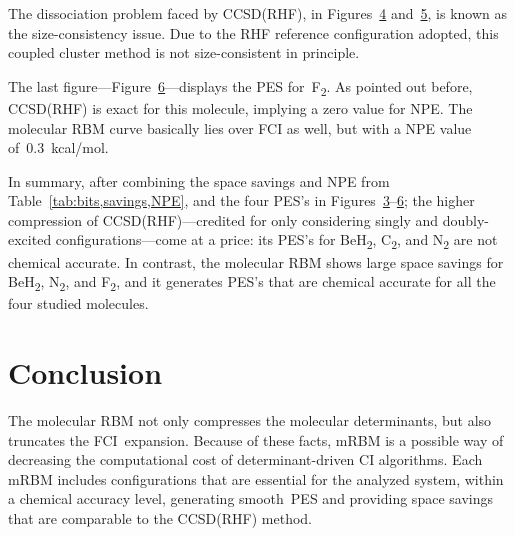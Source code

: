 \documentclass[%
 amsmath,amssymb,
 aps,prl, %
 reprint,%
]{revtex4-1}
\begin{document}
\indent The dissociation problem faced by CCSD(RHF), in Figures~\hyperlink{fig:C2_PES}{4} and~\hyperlink{fig:N2_PES}{5}, is known as the size-consistency issue. Due to the RHF reference configuration adopted, this coupled cluster method is not size-consistent in principle.~\cite{Roos1994,Gordon1996,Lee2009}

\indent The last figure---Figure~\hyperlink{fig:F2_PES}{6}---displays the PES for~F\textsubscript{2}. As pointed out before, CCSD(RHF) is exact for this molecule, implying a zero value for NPE. The molecular RBM curve basically lies over FCI as well, but with a NPE value of~0.3~kcal/mol.

\indent In summary, after combining the space savings and NPE from Table~\ref{tab:bits,savings,NPE}, and the four PES's in Figures~\hyperlink{fig:BeH2_PES}{3}--\hyperlink{fig:F2_PES}{6}; the higher compression of CCSD(RHF)---credited for only considering singly and doubly-excited configurations---come at a price: its PES's for BeH\textsubscript{2}, C\textsubscript{2}, and N\textsubscript{2} are not chemical accurate. In contrast, the molecular RBM shows large space savings for BeH\textsubscript{2}, N\textsubscript{2}, and F\textsubscript{2}, and it generates PES's that are chemical accurate for all the four studied molecules.






\section{Conclusion}

\indent The molecular RBM not only compresses the molecular determinants, but also truncates the FCI~expansion. Because of these facts, mRBM is a possible way of decreasing the computational cost of determinant-driven CI algorithms. Each mRBM includes configurations that are essential for the analyzed system, within a chemical accuracy level, generating smooth~PES and providing space savings that are comparable to the CCSD(RHF) method. 
\end{document}
